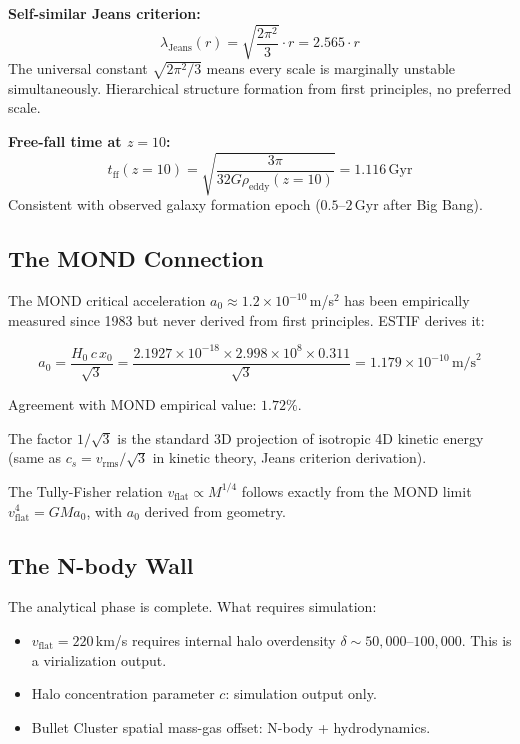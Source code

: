 \documentclass[12pt]{article}
\begin{document}
\textbf{Self-similar Jeans criterion:}
\begin{equation}
\lambda_\text{Jeans}(r) = \sqrt{\frac{2\pi^2}{3}}\cdot r = 2.565\cdot r
\end{equation}
The universal constant $\sqrt{2\pi^2/3}$ means every scale is marginally unstable
simultaneously. Hierarchical structure formation from first principles, no preferred scale.

\textbf{Free-fall time at $z = 10$:}
\begin{equation}
t_\text{ff}(z=10) = \sqrt{\frac{3\pi}{32G\rho_\text{eddy}(z=10)}} = 1.116\,\text{Gyr}
\end{equation}
Consistent with observed galaxy formation epoch ($0.5$--$2$\,Gyr after Big Bang).

\subsection{The MOND Connection}

The MOND critical acceleration $a_0 \approx 1.2\times10^{-10}$\,m/s$^2$ has been
empirically measured since 1983 but never derived from first principles. ESTIF derives it:

\begin{equation}
a_0 = \frac{H_0\,c\,x_0}{\sqrt{3}} = \frac{2.1927\times10^{-18} \times 2.998\times10^8 \times 0.311}{\sqrt{3}}
= 1.179\times10^{-10}\,\text{m/s}^2
\end{equation}

Agreement with MOND empirical value: $1.72\%$.

The factor $1/\sqrt{3}$ is the standard 3D projection of isotropic 4D kinetic energy
(same as $c_s = v_\text{rms}/\sqrt{3}$ in kinetic theory, Jeans criterion derivation).

The Tully-Fisher relation $v_\text{flat} \propto M^{1/4}$ follows exactly from the
MOND limit $v_\text{flat}^4 = GMa_0$, with $a_0$ derived from geometry.

\subsection{The N-body Wall}

The analytical phase is complete. What requires simulation:

\begin{itemize}
\item $v_\text{flat} = 220$\,km/s requires internal halo overdensity $\delta \sim 50{,}000$--$100{,}000$. This is a virialization output.
\item Halo concentration parameter $c$: simulation output only.
\item Bullet Cluster spatial mass-gas offset: N-body + hydrodynamics.
\end{itemize}
\end{document}
